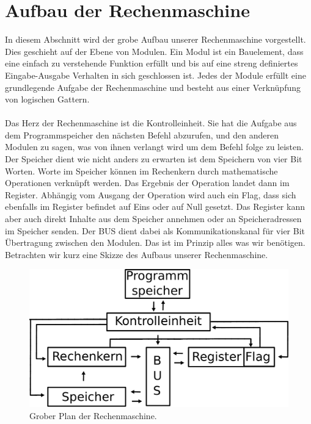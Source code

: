 \documentclass[11pt,a4paper,leqno]{report}
\numberwithin{equation}{chapter}
\begin{document}
\section{Aufbau der Rechenmaschine}
In diesem Abschnitt wird der grobe Aufbau unserer Rechenmaschine vorgestellt. Dies geschieht auf der Ebene von Modulen. Ein Modul ist ein Bauelement, dass eine einfach zu verstehende Funktion erf\"ullt und bis auf eine streng definiertes Eingabe-Ausgabe Verhalten in sich geschlossen ist. Jedes der Module erf\"ullt eine grundlegende Aufgabe der Rechenmaschine und besteht aus einer Verkn\"upfung von logischen Gattern.\\
\\
Das Herz der Rechenmaschine ist die Kontrolleinheit. Sie hat die Aufgabe aus dem Programmspeicher den n\"achsten Befehl abzurufen, und den anderen Modulen zu sagen, was von ihnen verlangt wird um dem Befehl folge zu leisten. Der Speicher dient wie nicht anders zu erwarten ist dem Speichern von vier Bit Worten. Worte im Speicher k\"onnen im Rechenkern durch mathematische Operationen verkn\"upft werden. Das Ergebnis der Operation landet dann im Register. Abh\"angig vom Ausgang der Operation wird auch ein Flag, dass sich ebenfalls im Register befindet auf Eins oder auf Null gesetzt.
Das Register kann aber auch direkt Inhalte aus dem Speicher annehmen oder an Speicheradressen im Speicher senden. Der BUS dient dabei als Kommunikationskanal f\"ur vier Bit \"Ubertragung zwischen den Modulen. Das ist im Prinzip alles was wir ben\"otigen. Betrachten wir kurz eine Skizze des Aufbaus unserer Rechenmaschine.
\begin{figure}[H]
	\begin{center}
		\includegraphics[scale=0.5]{Plan.pdf}
		\caption{Grober Plan der Rechenmaschine.}
	\end{center}
\end{figure}
\end{document}
